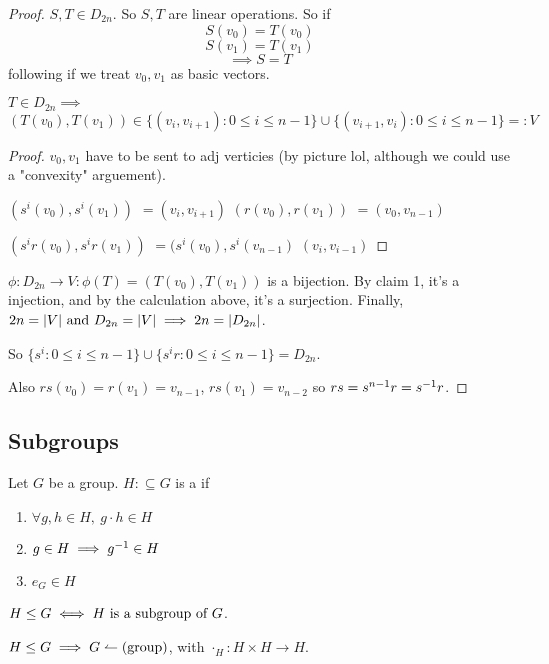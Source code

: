 \documentclass[12pt]{article}
\begin{document}
\bboxproof
\begin{proof}
  \(S,T\in D_{2n}\). So \(S,T\) are linear operations. So if
  \[S(v_0)=T(v_0)\]
  \[S(v_1)=T(v_1)\]
  \[\implies S=T\]
  following if we treat \(v_0,v_1\) as basic vectors.

   \(T\in D_{2n}\implies\)
  \[(T(v_0),T(v_1))\in\{(v_i,v_{i+1}):0\le i\le n-1\}
  \cup\{(v_{i+1},v_i):0\le i\le n-1\}=:V\]
  \bboxproof
  \begin{proof}
    \(v_0,v_1\) have to be sent to adj verticies (by picture lol, 
    although we could use a "convexity" arguement).

    $(s^i(v_0),s^i(v_1))$ $=(v_i,v_{i+1})$
    $(r(v_0),r(v_1))$
    $=(v_0,v_{n-1})$

    $(s^ir(v_0),s^ir(v_1))$ $=(s^i(v_0),s^i(v_{n-1})$ $(v_i,v_{i-1})$
  \end{proof}
  \ebox

   \(\phi:D_{2n}\to V:\phi(T)=(T(v_0),T(v_1))\) is a 
  bijection. By claim 1, it's a injection, and by the calculation above,
  it's a surjection. Finally, \(2n=|V|\text{ and }D_{2n}=|V|\implies 2n=|D_{2n}|\).

  So \(\{s^i:0\le i\le n-1\}\cup\{s^ir:0\le i\le n-1\}=D_{2n}\).

  Also \(rs(v_0)=r(v_1)=v_{n-1}\), \(rs(v_1)=v_{n-2}\) so
  \(rs=s^{n-1}r=s^{-1}r\).
\end{proof}
\ebox

\subsection{Subgroups}


\bbox
\begin{defn}[Subgroup]\label{defn:subgroup}
  Let \(G\) be a group. \(H\mathbin{:\subseteq} G\) is a  if
  \begin{enumerate}
    \item \(\forall g,h\in H,\ g\cdot h\in H\)
    \item \(g\in H\implies g^{-1}\in H\)
    \item \(e_G\in H\)
  \end{enumerate}
\end{defn}
\ebox

\bboxnote
\begin{nota}[Subgroup]\label{nota:subgroup}
  \(H\le G\iff H\text{ is a subgroup of }G\).
\end{nota}
\ebox

\bbox
\begin{prop}\label{prop:a_subgroup_is_a_group}
  \(H\le G\implies G\leftharpoonup(\mathrm{group})\), with \(\cdot_H:H\times H\to H\).
\end{prop}
\ebox
\end{document}
